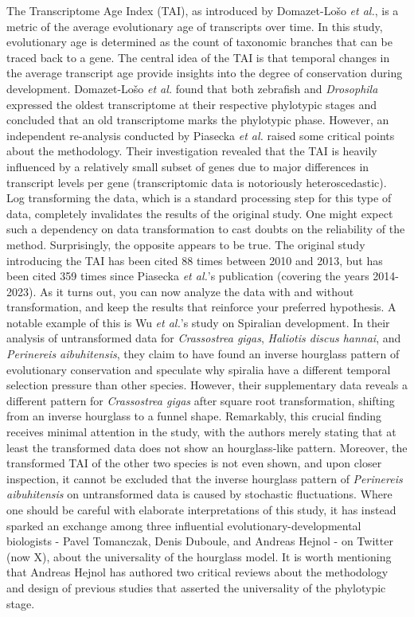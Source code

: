 The Transcriptome Age Index (TAI), as introduced by Domazet-Lošo \textit{et al.}, is a metric of the average evolutionary age of transcripts over time\cite{DomazetLoso2010}. In this study, evolutionary age is determined as the count of taxonomic branches that can be traced back to a gene. The central idea of the TAI is that temporal changes in the average transcript age provide insights into the degree of conservation during development. Domazet-Lošo \textit{et al.} found that both zebrafish and \textit{Drosophila} expressed the oldest transcriptome at their respective phylotypic stages and concluded that an old transcriptome marks the phylotypic phase. However, an independent re-analysis conducted by Piasecka \textit{et al.} raised some critical points about the methodology\cite{Piasecka2013}. Their investigation revealed that the TAI is heavily influenced by a relatively small subset of genes due to major differences in transcript levels per gene (transcriptomic data is notoriously heteroscedastic\cite{Rocke2001}). Log transforming the data, which is a standard processing step for this type of data, completely invalidates the results of the original study. One might expect such a dependency on data transformation to cast doubts on the reliability of the method. Surprisingly, the opposite appears to be true. The original study introducing the TAI has been cited 88 times between 2010 and 2013, but has been cited 359 times since Piasecka \textit{et al.}'s publication (covering the years 2014-2023). As it turns out, you can now analyze the data with and without transformation, and keep the results that reinforce your preferred hypothesis. A notable example of this is Wu \textit{et al.}'s study on Spiralian development\cite{Wu2019}. In their analysis of untransformed data for \textit{Crassostrea gigas}, \textit{Haliotis discus hannai}, and \textit{Perinereis aibuhitensis}, they claim to have found an inverse hourglass pattern of evolutionary conservation and speculate why spiralia have a different temporal selection pressure than other species. However, their supplementary data reveals a different pattern for \textit{Crassostrea gigas} after square root transformation, shifting from an inverse hourglass to a funnel shape. Remarkably, this crucial finding receives minimal attention in the study, with the authors merely stating that at least the transformed data does not show an hourglass-like pattern. Moreover, the transformed TAI of the other two species is not even shown, and upon closer inspection, it cannot be excluded that the inverse hourglass pattern of \textit{Perinereis aibuhitensis} on untransformed data is caused by stochastic fluctuations. Where one should be careful with elaborate interpretations of this study, it has instead sparked an exchange among three influential evolutionary-developmental biologists - Pavel Tomanczak, Denis Duboule, and Andreas Hejnol - on Twitter (now X), about the universality of the hourglass model\cite{hejnoltwitter}. It is worth mentioning that Andreas Hejnol has authored two critical reviews about the methodology and design of previous studies that asserted the universality of the phylotypic stage\cite{Dunn2018,hejnol2016}.

